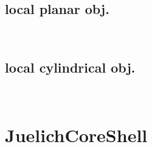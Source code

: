 \subsection{local planar  obj.} ~\\
\label{plugin:LocalPlanar)}

\subsection{local cylindrical obj.} ~\\
\label{plugin:LocalCylindrical)}


\clearpage
\section{JuelichCoreShell} ~\\

